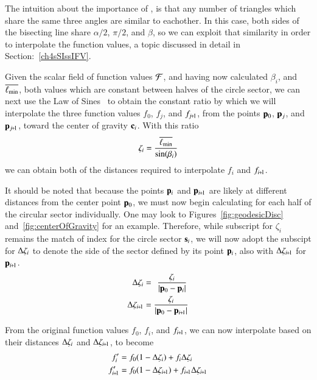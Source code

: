 The intuition about the importance of , is that any number of triangles which share the same three angles are similar to eachother. In this case, both sides of the bisecting line share $\alpha/2$, $\pi/2$, and $\beta$, so we can exploit that similarity in order to interpolate the function values, a topic discussed in detail in Section:~\ref{ch4sSIssIFV}.

Given the scalar field of function values $\mathcal{F}$, and having now calculated $\beta_i$, and $\overline{\ell_\text{min}}$, both values which are constant between halves of the circle sector, we can next use the Law of Sines~\cite{Weisstein19g} to obtain the constant ratio by which we will interpolate the three function values $f_0$, $f_j$, and $f_{\sjpo}$, from the points $\mathbf{p}_0$, $\mathbf{p}_j$, and $\bp_{\sjpo}$, toward the center of gravity $\mathbf{c}_i$. With this ratio
%
\begin{equation}
	\zeta_i = \frac{\overline{\ell_\text{min}}}{\sin(\beta_i)}
	\label{eq:zeta}
\end{equation}%
%
%
we can obtain both of the distances required to interpolate $f_i$ and $f_{\sipo}$. 

It should be noted that because the points $\mathbf{p}_i$ and $\bp_{\sipo}$ are likely at different distances from the center point $\mathbf{p}_0$, we must now begin calculating for each half of the circular sector individually. One may look to Figures~\ref{fig:geodesicDisc} and~\ref{fig:centerOfGravity} for an example. Therefore, while subscript for $\zeta_i$ remains the match of index for the circle sector $\mathbf{s}_i$, we will now adopt the subscipt for $\Delta\zeta_i$ to denote the side of the sector defined by its point $\mathbf{p}_i$, also with $\Dz_{\sipo}$ for $\bp_{\sipo}$.
\begin{align}
	\Dz_i & = \kern4pt\frac{\zeta_i}{|\bp_0 - \bp_i|}
	\label{eq:distanceIForInterpolation}\\
	\Dz_{\sipo} & = \frac{\zeta_i}{|\bp_0 - \bp_{\sipo}|}
	\label{eq:distanceIp1ForInterpolation}
\end{align}%
%

From the original function values $f_0$, $f_i$, and $f_{\sipo}$, we can now interpolate based on their distances $\Delta\zeta_i$ and $\Dz_{\sipo}$, to become
\begin{align}
	f'_i & = f_0(1 - \Dz_i) + f_i\Dz_i
	\label{eq:interpolatedFi} \\
	f'_{\sipo} & = f_0(1 - \Dz_{\sipo}) + f_{\sipo}\Dz_{\sipo}
	\label{eq:interpolatedFip1}
\end{align}%
%


